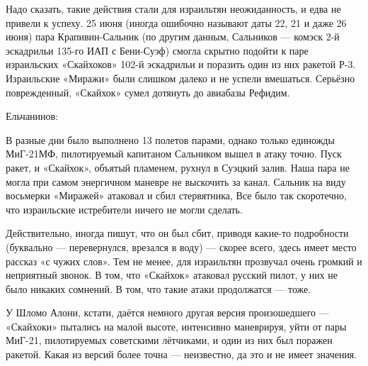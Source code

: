 Надо сказать, такие действия стали для израильтян неожиданность, и едва не привели к успеху. 25 июня (иногда ошибочно называют даты 22, 21 и даже 26 июня) пара Крапивин-Сальник (по другим данным, Сальников — комэск 2-й эскадрильи 135-го ИАП с Бени-Суэф) смогла скрытно подойти к паре израильских «Скайхоков» 102-й эскадрильи и поразить один из них ракетой Р-3. Израильские «Миражи» были слишком далеко и не успели вмешаться. Серьёзно поврежденный, «Скайхок» сумел дотянуть до авиабазы Рефидим. 

Ельчанинов:

\begin{textcitation}
	В разные дни было выполнено 13 полетов парами, однако только единожды МиГ-21МФ, пилотируемый капитаном Сальником вышел в атаку точно. Пуск ракет, и «Скайхок», объятый пламенем, рухнул в Суэцкий залив. Наша пара не могла при самом энергичном маневре не выскочить за канал. Сальник на виду восьмерки «Миражей» атаковал и сбил стервятника, Все было так скоротечно, что израильские истребители ничего не могли сделать.
\end{textcitation}

Действительно, иногда пишут, что он был сбит, приводя какие-то подробности (буквально — перевернулся, врезался в воду) — скорее всего, здесь имеет место рассказ «с чужих слов». Тем не менее, для израильтян прозвучал очень громкий и неприятный звонок. В том, что «Скайхок» атаковал русский пилот, у них не было никаких сомнений. В том, что такие атаки продолжатся — тоже.

У Шломо Алони, кстати, даётся немного другая версия произошедшего — «Скайхоки» пытались на малой высоте, интенсивно маневрируя, уйти от пары МиГ-21, пилотируемых советскими лётчиками, и один из них был поражен ракетой. Какая из версий более точна — неизвестно, да это и не имеет значения.

